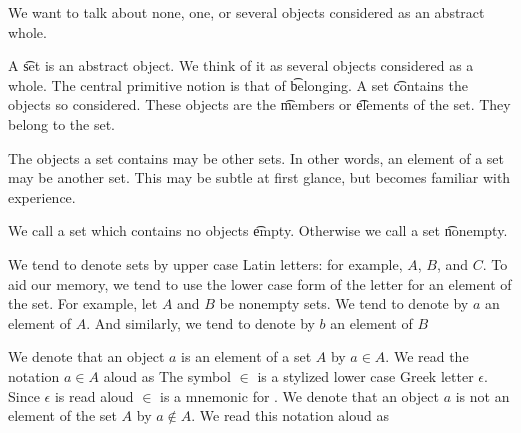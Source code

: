 
We want to talk about none, one, or several objects considered as an abstract whole.


A \t{set} is an abstract object.
We think of it as several objects considered as a whole.
The central primitive notion is that of \t{belonging}.
A set \t{contains} the objects so considered.
These objects are the \t{members} or \t{elements} of the set.
They belong to the set.

The objects a set contains may be other sets.
In other words, an element of a set may be another set.
This may be subtle at first glance, but becomes familiar with experience.

We call a set which contains no objects \t{empty}.
Otherwise we call a set \t{nonempty}.

We tend to denote sets by upper case Latin letters: for example, $A$, $B$, and $C$.
To aid our memory, we tend to use the lower case form of the letter for an element of the set.
For example, let $A$ and $B$ be nonempty sets.
We tend to denote by $a$ an element of $A$. And similarly, we tend to denote by $b$ an element of $B$

We denote that an object $a$ is an element of a set $A$ by $a \in A$.
We read the notation $a \in A$ aloud as 
The symbol $\in$ is a stylized lower case Greek letter $\epsilon$.
Since $\epsilon$ is read aloud  $\in$ is a mnemonic for .
We denote that an object $a$ is not an element of the set $A$ by $a \not\in A$.
We read this notation aloud as 
%
%


